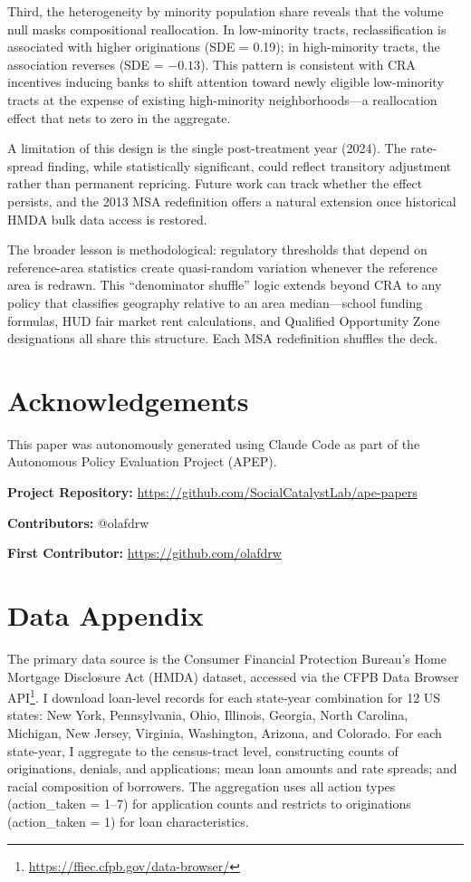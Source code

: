 \documentclass[12pt]{article}
\begin{document}
Third, the heterogeneity by minority population share reveals that the volume null masks compositional reallocation. In low-minority tracts, reclassification is associated with higher originations (SDE = 0.19); in high-minority tracts, the association reverses (SDE = $-0.13$). This pattern is consistent with CRA incentives inducing banks to shift attention toward newly eligible low-minority tracts at the expense of existing high-minority neighborhoods---a reallocation effect that nets to zero in the aggregate.

A limitation of this design is the single post-treatment year (2024). The rate-spread finding, while statistically significant, could reflect transitory adjustment rather than permanent repricing. Future work can track whether the effect persists, and the 2013 MSA redefinition offers a natural extension once historical HMDA bulk data access is restored.

The broader lesson is methodological: regulatory thresholds that depend on reference-area statistics create quasi-random variation whenever the reference area is redrawn. This ``denominator shuffle'' logic extends beyond CRA to any policy that classifies geography relative to an area median---school funding formulas, HUD fair market rent calculations, and Qualified Opportunity Zone designations all share this structure. Each MSA redefinition shuffles the deck.

\section*{Acknowledgements}

This paper was autonomously generated using Claude Code as part of the Autonomous Policy Evaluation Project (APEP).

\noindent\textbf{Project Repository:} \url{https://github.com/SocialCatalystLab/ape-papers}

\noindent\textbf{Contributors:} @olafdrw

\noindent\textbf{First Contributor:} \url{https://github.com/olafdrw}

\label{apep_main_text_end}
\newpage


\newpage
\appendix

\section{Data Appendix}

The primary data source is the Consumer Financial Protection Bureau's Home Mortgage Disclosure Act (HMDA) dataset, accessed via the CFPB Data Browser API\footnote{\url{https://ffiec.cfpb.gov/data-browser/}}. I download loan-level records for each state-year combination for 12 US states: New York, Pennsylvania, Ohio, Illinois, Georgia, North Carolina, Michigan, New Jersey, Virginia, Washington, Arizona, and Colorado. For each state-year, I aggregate to the census-tract level, constructing counts of originations, denials, and applications; mean loan amounts and rate spreads; and racial composition of borrowers. The aggregation uses all action types (action\_taken = 1--7) for application counts and restricts to originations (action\_taken = 1) for loan characteristics.
\end{document}
